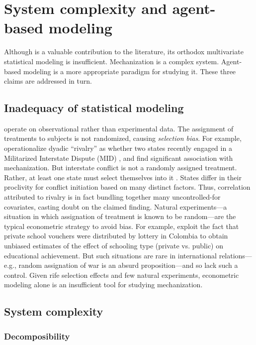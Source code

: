 \documentclass{article}
\begin{document}
\section{System complexity and agent-based modeling}

Although \citet{sechser2010army} is a valuable contribution to the literature,
its orthodox multivariate statistical modeling is insufficient. Mechanization is a complex system. 
Agent-based modeling is a more appropriate paradigm for studying it. These three claims are addressed in turn. 

\subsection{Inadequacy of statistical modeling}

\citet{sechser2010army} operate on observational rather than experimental
data. The assignment of treatments to subjects is not randomized, causing
\textit{selection bias}. For example, \citet{sechser2010army} operationalize
dyadic ``rivalry'' as whether two states recently engaged in a Militarized
Interstate Dispute (MID) \citep{cow_midb}, and find significant association with mechanization. 
But interstate conflict is not a randomly assigned treatment. Rather, at least one state must select
themselves into it \citep{fearon2002selection}. States differ in their
proclivity for conflict initiation based on many distinct factors. 
Thus, correlation attributed to rivalry is in fact
bundling together many uncontrolled-for covariates, casting doubt on the claimed
finding. Natural experiments---a situation in which assignation of treatment is
known to be random---are the typical econometric strategy to avoid bias. For
example, \citet{angrist2002vouchers} exploit the fact that private school
vouchers were distributed by lottery in Colombia to obtain unbiased estimates of
the effect of schooling type (private vs. public) on educational achievement.
But such situations are rare in international relations---e.g., random assignation of war is an
absurd proposition---and so
\citet{sechser2010army} lack such a control. Given rife selection effects and few
natural experiments, econometric modeling alone is an insufficient tool for studying mechanization. 

\subsection{System complexity}

\subsubsection{Decomposibility}
\end{document}
